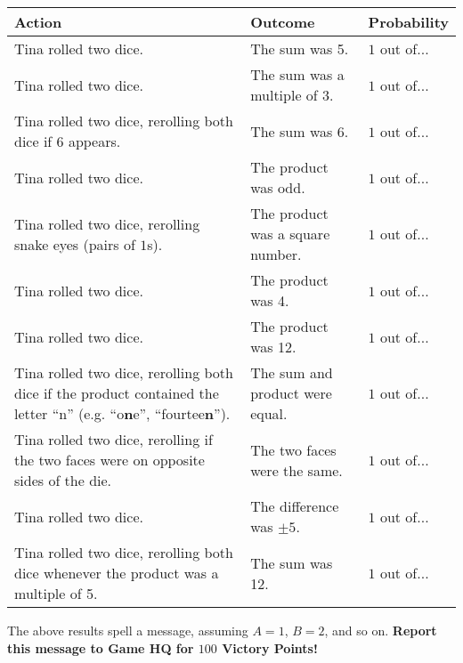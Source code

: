 \begin{puzzle}
\begin{center}\begin{tabular}{m{2.8 in}|l|l}
Action & Outcome & Probability \\ \hline \hline
Tina rolled two dice. & The sum was 5. & \(1\) out of... \hspace{3em} \\  \hline
Tina rolled two dice. & The sum was a multiple of 3. & \(1\) out of... \hspace{3em} \\  \hline
Tina rolled two dice, rerolling both dice if 6 appears. & The sum was 6. & \(1\) out of... \hspace{3em} \\  \hline \hline
Tina rolled two dice. & The product was odd. & \(1\) out of... \hspace{3em} \\  \hline
Tina rolled two dice, rerolling snake eyes (pairs of \(1\)s). & The product was a square number. & \(1\) out of... \hspace{3em} \\  \hline
Tina rolled two dice. & The product was 4. & \(1\) out of... \hspace{3em} \\  \hline
Tina rolled two dice. & The product was 12. & \(1\) out of... \hspace{3em} \\  \hline
Tina rolled two dice, rerolling both dice if the product contained the letter ``n'' (e.g. ``o\textbf{n}e'', ``fourtee\textbf{n}''). & The sum and product were equal. & \(1\) out of... \hspace{3em} \\  \hline
Tina rolled two dice, rerolling if the two faces were on opposite sides of the die. & The two faces were the same. & \(1\) out of... \hspace{3em} \\  \hline
Tina rolled two dice. & The difference was \(\pm5\). & \(1\) out of... \hspace{3em} \\  \hline
Tina rolled two dice, rerolling both dice whenever the product was a multiple of 5. & The sum was 12. & \(1\) out of... \hspace{3em}  \\
\end{tabular}\end{center}

\vfill

The above results spell a message, assuming \(A=1\), \(B=2\),
and so on. \textbf{Report
this message to Game HQ for \(100\) Victory Points!}


\end{puzzle}
